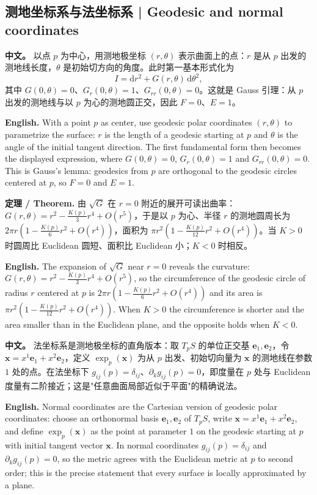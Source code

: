 \documentclass[UTF8,11pt,a4paper]{ctexart}
\newcommand{\APS}[2]{\par\noindent\textbf{中文。} #1\par\noindent\textbf{English.} #2\par\smallskip}
\newcommand{\EN}[1]{\par\noindent \textbf{English.} #1\par}
\newcommand{\THM}[2]{\par\noindent\textbf{定理 / Theorem.} #1\par\EN{#2}\par\smallskip}
\newcommand{\dd}{\mathrm{d}}
\newcommand{\be}{\mathbf{e}}
\newcommand{\bx}{\mathbf{x}}
\begin{document}
\subsection{测地坐标系与法坐标系 | Geodesic and normal coordinates}
\APS{以点 $p$ 为中心，用测地极坐标 $(r,\theta)$ 表示曲面上的点：$r$ 是从 $p$ 出发的测地线长度，$\theta$ 是初始切方向的角度。此时第一基本形式化为
\[
I=\dd r^2+G(r,\theta)\,\dd\theta^2,
\]
其中 $G(0,\theta)=0$、$G_r(0,\theta)=1$、$G_{rr}(0,\theta)=0$。这就是 Gauss 引理：从 $p$ 出发的测地线与以 $p$ 为心的测地圆正交，因此 $F=0$、$E=1$。}{With a point $p$ as center, use geodesic polar coordinates $(r,\theta)$ to parametrize the surface: $r$ is the length of a geodesic starting at $p$ and $\theta$ is the angle of the initial tangent direction. The first fundamental form then becomes the displayed expression, where $G(0,\theta)=0$, $G_r(0,\theta)=1$ and $G_{rr}(0,\theta)=0$. This is Gauss's lemma: geodesics from $p$ are orthogonal to the geodesic circles centered at $p$, so $F=0$ and $E=1$.}
\THM{由 $\sqrt G$ 在 $r=0$ 附近的展开可读出曲率：$G(r,\theta)=r^2-\frac{K(p)}{3}r^4+O(r^5)$，于是以 $p$ 为心、半径 $r$ 的测地圆周长为 $2\pi r\left(1-\frac{K(p)}{6}r^2+O(r^4)\right)$，面积为 $\pi r^2\left(1-\frac{K(p)}{12}r^2+O(r^4)\right)$。当 $K>0$ 时圆周比 Euclidean 圆短、面积比 Euclidean 小；$K<0$ 时相反。}{The expansion of $\sqrt G$ near $r=0$ reveals the curvature: $G(r,\theta)=r^2-\frac{K(p)}{3}r^4+O(r^5)$, so the circumference of the geodesic circle of radius $r$ centered at $p$ is $2\pi r(1-\frac{K(p)}{6}r^2+O(r^4))$ and its area is $\pi r^2(1-\frac{K(p)}{12}r^2+O(r^4))$. When $K>0$ the circumference is shorter and the area smaller than in the Euclidean plane, and the opposite holds when $K<0$.}
\APS{法坐标系是测地极坐标的直角版本：取 $T_pS$ 的单位正交基 $\be_1,\be_2$，令 $\bx=x^1\be_1+x^2\be_2$，定义 $\exp_p(\bx)$ 为从 $p$ 出发、初始切向量为 $\bx$ 的测地线在参数 $1$ 处的点。在法坐标下 $g_{ij}(p)=\delta_{ij}$、$\partial_k g_{ij}(p)=0$，即度量在 $p$ 处与 Euclidean 度量有二阶接近；这是"任意曲面局部近似于平面"的精确说法。}{Normal coordinates are the Cartesian version of geodesic polar coordinates: choose an orthonormal basis $\be_1,\be_2$ of $T_pS$, write $\bx=x^1\be_1+x^2\be_2$, and define $\exp_p(\bx)$ as the point at parameter $1$ on the geodesic starting at $p$ with initial tangent vector $\bx$. In normal coordinates $g_{ij}(p)=\delta_{ij}$ and $\partial_k g_{ij}(p)=0$, so the metric agrees with the Euclidean metric at $p$ to second order; this is the precise statement that every surface is locally approximated by a plane.}
\end{document}
